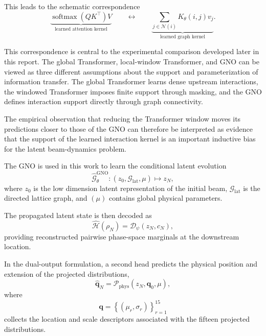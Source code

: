 \documentclass[11pt,a4paper]{article}
\begin{document}
\begin{sloppypar}
This leads to the schematic correspondence
\begin{equation}
\underbrace{
\operatorname{softmax}
\left(
QK^{\top}
\right)V
}_{\text{learned attention kernel}}
\qquad
\longleftrightarrow
\qquad
\underbrace{
\sum_{j\in\mathcal{N}(i)}
K_{\theta}(i,j)v_j
}_{\text{learned graph kernel}}.
\label{eq:gno_attention_correspondence}
\end{equation}

This correspondence is central to the experimental comparison developed later in this report. The global Transformer, local-window Transformer, and GNO can be viewed as three different assumptions about the support and parameterization of information transfer. The global Transformer learns dense upstream interactions, the windowed Transformer imposes finite support through masking, and the GNO defines interaction support directly through graph connectivity.

The empirical observation that reducing the Transformer window moves its predictions closer to those of the GNO can therefore be interpreted as evidence that the support of the learned interaction kernel is an important inductive bias for the latent beam-dynamics problem.

The GNO is used in this work to learn the conditional latent evolution
\begin{equation}
\widehat{\mathcal{G}}_{\theta}^{\mathrm{GNO}}
:
(z_0,\mathcal{G}_{\mathrm{lat}},\mu)
\longmapsto
z_N,
\label{eq:gno_present_task}
\end{equation}
where $z_0$ is the low dimension latent representation of the initial beam, $\mathcal{G}_{\mathrm{lat}}$ is the directed lattice graph, and $(\mu)$ contains global physical parameters.

The propagated latent state is then decoded as
\begin{equation}
\widehat{\mathcal{H}}(\rho_N)
=
\mathcal{D}_{\psi}(z_N,c_N),
\label{eq:gno_decoding}
\end{equation}
providing reconstructed pairwise phase-space marginals at the downstream location.

In the dual-output formulation, a second head predicts the physical position and extension of the projected distributions,
\begin{equation}
\widehat{\bm q}_{N}
=
\mathcal{P}_{\mathrm{phys}}
\left(
z_N,
\bm q_0,
\mu
\right),
\label{eq:gno_physics_head}
\end{equation}
where
\begin{equation}
\bm q
=
\left\{
(\mu_r,\sigma_r)
\right\}_{r=1}^{15}
\end{equation}
collects the location and scale descriptors associated with the fifteen projected distributions.


\end{sloppypar}
\end{document}
